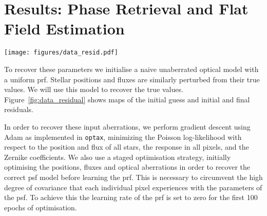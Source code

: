 \documentclass[]{spieman}
\newcommand\optax{\texttt{optax}\xspace}
\begin{document}
\section{Results: Phase Retrieval and Flat Field Estimation}
\label{sec:phaseretrieval}



\begin{figure*}
    \centering
    \texttt{[image: figures/data\_resid.pdf]}
    \caption{Left: single image of the full four that is used to create the full data set. This image has had both photon and detector noise applied. By eye it is clearly difficult to disentangle the astrophysical information. The large number of overlapping \ac{psf}s is chosen in order to spread light across the majority of the detector so that we encode the PRF information for as much of the detector as possible. Middle: the residual of this single image from the data and the initial uncalibrated model. Clearly these residuals are large, showing that there is a large amount of calibration required. Right: this same residual after the model has been optimised. The residual values are much smaller and at the noise floor. A small zoomed region is shown so that the individual pixel-level residuals can be seen.}
    \label{fig:data_residual}
\end{figure*}




To recover these parameters we initialise a naive unaberrated optical model with a uniform \ac{prf}. Stellar positions and fluxes are similarly perturbed from their true values. We will use this model to recover the true values. Figure~\ref{fig:data_residual} shows maps of the initial guess and initial and final residuals.

In order to recover these input aberrations, we perform gradient descent using Adam \cite{Kingma2014} as implemented in \optax \cite{optax2020github}, minimizing the Poisson log-likelihood with respect to the position and flux of all stars, the response in all pixels, and the Zernike coefficients. We also use a staged optimisation strategy, initially optimising the positions, fluxes and optical aberrations in order to recover the correct \ac{psf} model before learning the \ac{prf}. This is necessary to circumvent the high degree of covariance that each individual pixel experiences with the parameters of the \ac{psf}. To achieve this the learning rate of the \ac{prf} is set to zero for the first 100 epochs of optimisation.
\end{document}
